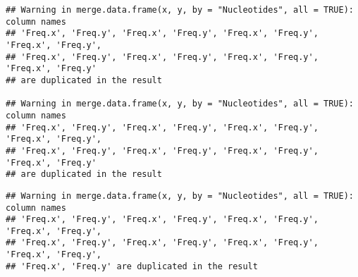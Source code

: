 \documentclass[
]{article}
\begin{document}
\begin{verbatim}
## Warning in merge.data.frame(x, y, by = "Nucleotides", all = TRUE): column names
## 'Freq.x', 'Freq.y', 'Freq.x', 'Freq.y', 'Freq.x', 'Freq.y', 'Freq.x', 'Freq.y',
## 'Freq.x', 'Freq.y', 'Freq.x', 'Freq.y', 'Freq.x', 'Freq.y', 'Freq.x', 'Freq.y'
## are duplicated in the result

## Warning in merge.data.frame(x, y, by = "Nucleotides", all = TRUE): column names
## 'Freq.x', 'Freq.y', 'Freq.x', 'Freq.y', 'Freq.x', 'Freq.y', 'Freq.x', 'Freq.y',
## 'Freq.x', 'Freq.y', 'Freq.x', 'Freq.y', 'Freq.x', 'Freq.y', 'Freq.x', 'Freq.y'
## are duplicated in the result
\end{verbatim}

\begin{verbatim}
## Warning in merge.data.frame(x, y, by = "Nucleotides", all = TRUE): column names
## 'Freq.x', 'Freq.y', 'Freq.x', 'Freq.y', 'Freq.x', 'Freq.y', 'Freq.x', 'Freq.y',
## 'Freq.x', 'Freq.y', 'Freq.x', 'Freq.y', 'Freq.x', 'Freq.y', 'Freq.x', 'Freq.y',
## 'Freq.x', 'Freq.y' are duplicated in the result
\end{verbatim}
\end{document}
